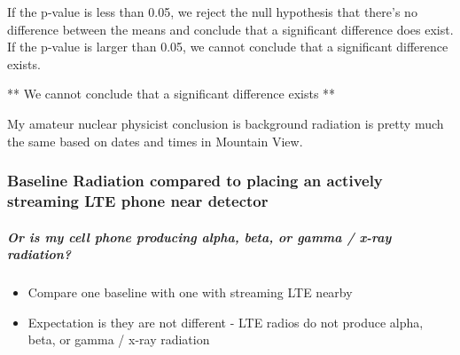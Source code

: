 \documentclass[11pt]{article}
\providecommand{\tightlist}{%
      \setlength{\itemsep}{0pt}\setlength{\parskip}{0pt}}
\begin{document}
If the p-value is less than 0.05, we reject the null hypothesis that
there's no difference between the means and conclude that a significant
difference does exist. If the p-value is larger than 0.05, we cannot
conclude that a significant difference exists.

** We cannot conclude that a significant difference exists **

My amateur nuclear physicist conclusion is background radiation is
pretty much the same based on dates and times in Mountain View.

    \subsubsection{Baseline Radiation compared to placing an actively
streaming LTE phone near
detector}\label{baseline-radiation-compared-to-placing-an-actively-streaming-lte-phone-near-detector}

\subparagraph{Or is my cell phone producing alpha, beta, or gamma /
x-ray
radiation?}\label{or-is-my-cell-phone-producing-alpha-beta-or-gamma-x-ray-radiation}

\begin{itemize}
\tightlist
\item
  Compare one baseline with one with streaming LTE nearby
\item
  Expectation is they are not different - LTE radios do not produce
  alpha, beta, or gamma / x-ray radiation
\end{itemize}
\end{document}

